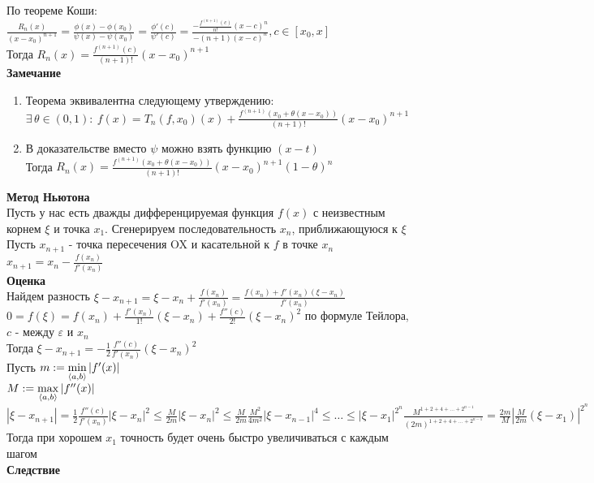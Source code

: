 \documentclass[12pt]{article}
\begin{document}
По теореме Коши:\\
$\frac{R_n(x)}{(x-x_0)^{n+1}} = \frac{\phi(x)-\phi(x_0)}{\psi(x)-\psi(x_0)} = \frac{\phi'(c)}{\psi'(c)} = \frac{-\frac{f^{(n+1)}(c)}{n!}(x-c)^n}{-(n+1)(x-c)^n}, c \in [x_0, x]$\\
Тогда $R_n(x) = \frac{f^{(n+1)}(c)}{(n+1)!}(x-x_0)^{n+1}$\\
\textbf{Замечание}
\begin{enumerate}
    \item Теорема эквивалентна следующему утверждению:\\
    $\exists\,\theta\in (0, 1):\ f(x) = T_n(f, x_0)(x) + \frac{f^{(n+1)}(x_0+\theta(x-x_0))}{(n+1)!}(x-x_0)^{n+1}$
    \item В доказательстве вместо $\psi$ можно взять функцию $(x-t)$\\
    Тогда $R_n(x) = \frac{f^{(n+1)}(x_0+\theta(x-x_0))}{(n+1)!}(x-x_0)^{n+1}(1-\theta)^n$
\end{enumerate}
\textbf{Метод Ньютона}\\
Пусть у нас есть дважды дифференцируемая функция $f(x)$ с неизвестным корнем $\xi$ и точка $x_1$. Сгенерируем последовательность $x_n$, приближающуюся к $\xi$\\
Пусть $x_{n+1}$ - точка пересечения OX и касательной к $f$ в точке $x_n$\\
$x_{n+1} = x_n - \frac{f(x_n)}{f'(x_n)}$\\
\textbf{Оценка}\\
Найдем разность $\xi - x_{n+1} = \xi - x_n + \frac{f(x_n)}{f'(x_n)} = \frac{f(x_n)+f'(x_n)(\xi - x_n)}{f'(x_n)}$\\
$0 = f(\xi) = f(x_n) + \frac{f'(x_n)}{1!}(\xi - x_n) + \frac{f''(c)}{2!}(\xi - x_n)^2$ по формуле Тейлора, $c$ - между $\varepsilon$ и $x_n$\\
Тогда $\xi - x_{n+1} = -\frac12 \frac{f''(c)}{f'(x_n)}(\xi-x_n)^2$\\
Пусть $m := \min\limits_{\langle a, b\rangle} |f'(x)|$\\
$M := \max\limits_{\langle a, b \rangle} |f''(x)|$\\
$|\xi - x_{n+1}| = \frac12 \frac{f''(c)}{f'(x_n)}|\xi-x_n|^2 \leq \frac{M}{2m}|\xi-x_n|^2 \leq \frac{M}{2m} \frac{M^2}{4m^2} |\xi - x_{n-1}|^4 \leq \ldots \leq |\xi - x_1| ^{2^n} \frac{M^{1+2+4+\ldots+2^{n-1}}}{(2m)^{1+2+4+\ldots+2^{n-1}}} = \frac{2m}{M}|\frac{M}{2m}(\xi - x_1)|^{2^n}$\\
Тогда при хорошем $x_1$ точность будет очень быстро увеличиваться с каждым шагом\\
\textbf{Следствие}\\
\end{document}
